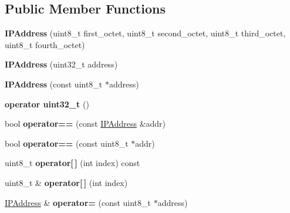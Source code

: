 \subsection*{Public Member Functions}
\begin{DoxyCompactItemize}
\item 
\hypertarget{class_i_p_address_af25acf9a16981a1b95c66e9e683245b0}{}{\bfseries I\+P\+Address} (uint8\+\_\+t first\+\_\+octet, uint8\+\_\+t second\+\_\+octet, uint8\+\_\+t third\+\_\+octet, uint8\+\_\+t fourth\+\_\+octet)\label{class_i_p_address_af25acf9a16981a1b95c66e9e683245b0}

\item 
\hypertarget{class_i_p_address_a9acd9971a8fc47fa51681e9b9a95b511}{}{\bfseries I\+P\+Address} (uint32\+\_\+t address)\label{class_i_p_address_a9acd9971a8fc47fa51681e9b9a95b511}

\item 
\hypertarget{class_i_p_address_ab747742c0a428a369f6ab73b7d28c306}{}{\bfseries I\+P\+Address} (const uint8\+\_\+t $\ast$address)\label{class_i_p_address_ab747742c0a428a369f6ab73b7d28c306}

\item 
\hypertarget{class_i_p_address_a90aebdb7f5f655fe3a5e3d8aa3bc3ac8}{}{\bfseries operator uint32\+\_\+t} ()\label{class_i_p_address_a90aebdb7f5f655fe3a5e3d8aa3bc3ac8}

\item 
\hypertarget{class_i_p_address_adc404569f7c8193c1be9d79a27753099}{}bool {\bfseries operator==} (const \hyperlink{class_i_p_address}{I\+P\+Address} \&addr)\label{class_i_p_address_adc404569f7c8193c1be9d79a27753099}

\item 
\hypertarget{class_i_p_address_af685847e3b72825b9c9f0ed5b828683f}{}bool {\bfseries operator==} (const uint8\+\_\+t $\ast$addr)\label{class_i_p_address_af685847e3b72825b9c9f0ed5b828683f}

\item 
\hypertarget{class_i_p_address_ac1e9d3628dc5bc5151324c80a69ad159}{}uint8\+\_\+t {\bfseries operator\mbox{[}$\,$\mbox{]}} (int index) const \label{class_i_p_address_ac1e9d3628dc5bc5151324c80a69ad159}

\item 
\hypertarget{class_i_p_address_ab7c569a71648e9235ebb63d7a6d58143}{}uint8\+\_\+t \& {\bfseries operator\mbox{[}$\,$\mbox{]}} (int index)\label{class_i_p_address_ab7c569a71648e9235ebb63d7a6d58143}

\item 
\hypertarget{class_i_p_address_a0dc5d0937fec535ef61daa5d05f30d3a}{}\hyperlink{class_i_p_address}{I\+P\+Address} \& {\bfseries operator=} (const uint8\+\_\+t $\ast$address)\label{class_i_p_address_a0dc5d0937fec535ef61daa5d05f30d3a}


\end{DoxyCompactItemize}
